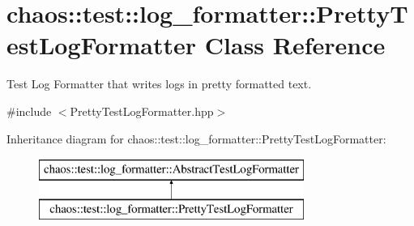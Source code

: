 \hypertarget{classchaos_1_1test_1_1log__formatter_1_1_pretty_test_log_formatter}{}\section{chaos\+:\+:test\+:\+:log\+\_\+formatter\+:\+:Pretty\+Test\+Log\+Formatter Class Reference}
\label{classchaos_1_1test_1_1log__formatter_1_1_pretty_test_log_formatter}


Test Log Formatter that writes logs in pretty formatted text.  




{\ttfamily \#include $<$Pretty\+Test\+Log\+Formatter.\+hpp$>$}

Inheritance diagram for chaos\+:\+:test\+:\+:log\+\_\+formatter\+:\+:Pretty\+Test\+Log\+Formatter\+:\begin{figure}[H]
\begin{center}
\leavevmode
\includegraphics[height=2.000000cm]{classchaos_1_1test_1_1log__formatter_1_1_pretty_test_log_formatter}
\end{center}
\end{figure}
